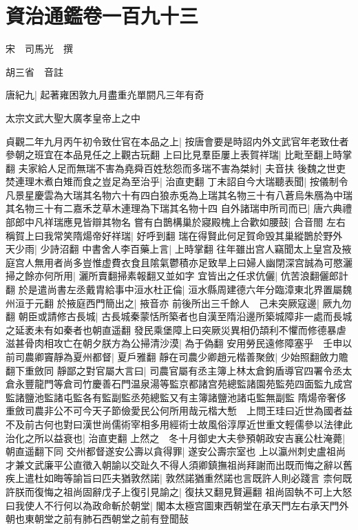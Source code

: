 \chapter{資治通鑑卷一百九十三}
宋　司馬光　撰

胡三省　音註

唐紀九|{
	起著雍困敦九月盡重灮單閼凡三年有奇}


太宗文武大聖大廣孝皇帝上之中

貞觀二年九月丙午初令致仕官在本品之上|{
	按唐會要是時詔内外文武官年老致仕者參朝之班宜在本品見任之上觀古玩翻}
上曰比見羣臣屢上表賀祥瑞|{
	比毗至翻上時掌翻}
夫家給人足而無瑞不害為堯舜百姓愁怨而多瑞不害為桀紂|{
	夫音扶}
後魏之世吏焚連理木煮白雉而食之豈足為至治乎|{
	治直吏翻}
丁未詔自今大瑞聽表聞|{
	按儀制令凡景星慶雲為大瑞其名物六十有四白狼赤兎為上瑞其名物三十有八蒼烏朱鴈為中瑞其名物三十有二嘉禾芝草木連理為下瑞其名物十四}
自外諸瑞申所司而已|{
	唐六典禮部郎中凡祥瑞應見皆辯其物名}
嘗有白鵲構巢於寢殿槐上合歡如腰鼓|{
	合音閤}
左右稱賀上曰我常笑隋煬帝好祥瑞|{
	好呼到翻}
瑞在得賢此何足賀命毁其巢縱鵲於野外　天少雨|{
	少詩沼翻}
中書舍人李百藥上言|{
	上時掌翻}
往年雖出宫人竊聞太上皇宫及掖庭宫人無用者尚多豈惟虚費衣食且隂氣鬱積亦足致旱上曰婦人幽閉深宫誠為可愍灑掃之餘亦何所用|{
	灑所賣翻掃素報翻又並如字}
宜皆出之任求伉儷|{
	伉苦浪翻儷郎計翻}
於是遣尚書左丞戴胄給事中洹水杜正倫|{
	洹水縣周建德六年分臨漳東北界置屬魏州洹于元翻}
於掖庭西門簡出之|{
	掖音亦}
前後所出三千餘人　己未突厥寇邊|{
	厥九勿翻}
朝臣或請修古長城|{
	古長城秦蒙恬所築者也自漢至隋沿邊所築城障非一處而長城之延袤未有如秦者也朝直遥翻}
發民乘堡障上曰突厥災異相仍頡利不懼而修德暴虐滋甚骨肉相攻亡在朝夕朕方為公掃清沙漠|{
	為于偽翻}
安用勞民遠修障塞乎　壬申以前司農卿竇靜為夏州都督|{
	夏戶雅翻}
靜在司農少卿趙元楷善聚斂|{
	少始照翻斂力贍翻下重斂同}
靜鄙之對官屬大言曰|{
	司農官屬有丞主簿上林太倉鉤盾導官四署令丞太倉永豐龍門等倉司竹慶善石門温泉湯等監京都諸宫苑總監諸園苑監苑四面監九成宫監諸鹽池監諸屯監各有監副監丞苑總監又有主簿諸鹽池諸屯監無副監}
隋煬帝奢侈重斂司農非公不可今天子節儉愛民公何所用哉元楷大慙　上問王珪曰近世為國者益不及前古何也對曰漢世尚儒術宰相多用經術士故風俗淳厚近世重文輕儒參以法律此治化之所以益衰也|{
	治直吏翻}
上然之　冬十月御史大夫參預朝政安吉襄公杜淹薨|{
	朝直遥翻下同}
交州都督遂安公壽以貪得罪|{
	遂安公壽宗室也}
上以瀛州刺史盧祖尚才兼文武廉平公直徵入朝諭以交趾久不得人須卿鎮撫祖尚拜謝而出既而悔之辭以舊疾上遣杜如晦等諭旨曰匹夫猶敦然諾|{
	敦然諾猶重然諾也言既許人則必踐言}
柰何既許朕而復悔之祖尚固辭戊子上復引見諭之|{
	復扶又翻見賢遍翻}
祖尚固執不可上大怒曰我使人不行何以為政命斬於朝堂|{
	閣本太極宫圖東西朝堂在承天門左右承天門外朝也東朝堂之前有肺石西朝堂之前有登聞鼔}
